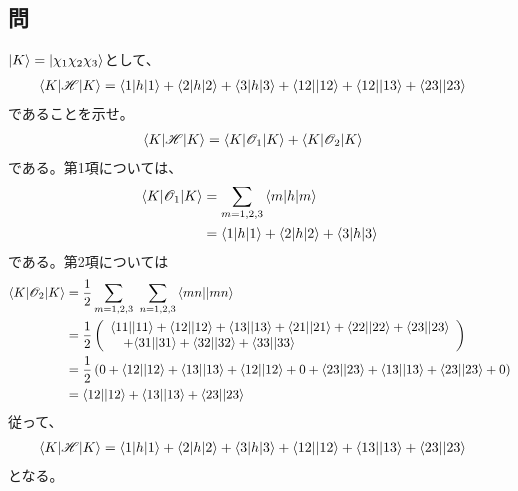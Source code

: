 \subsection{問}
$\ket{K}=\ket{\chi_1\chi_2\chi_3}$として、
\begin{align}
	\braket{K|\mathscr{H}|K}
&=
	\braket{1|h|1}
	+
	\braket{2|h|2}
	+
	\braket{3|h|3}
	+
	{\braket{12||12}}
	+
	{\braket{12||13}}
	+
	{\braket{23||23}}
\end{align}
であることを示せ。
\begin{align}
	\braket{K|\mathscr{H}|K}
&=
	\braket{K|\mathscr{O}_1|K}
	+
	\braket{K|\mathscr{O}_2|K}
\end{align}
である。第1項については、
\begin{align}
	\braket{K|\mathscr{O}_1|K}
&=
	\sum_{m=1,2,3} \braket{m|h|m} \\
%
%
&=
	\braket{1|h|1}
	+
	\braket{2|h|2}
	+
	\braket{3|h|3}
\end{align}
である。第2項については
\begin{align}
	\braket{K|\mathscr{O}_2|K}
&=
	\frac{1}{2}
	\sum_{m=1,2,3}\ \sum_{n=1,2,3}
		\antitwo{mn}{mn} \\
%
%
&=
	\frac{1}{2}
	\left(
	\begin{array}{l}
		\antitwo{11}{11}
		+
		\antitwo{12}{12}
		+
		\antitwo{13}{13}
		+
		\antitwo{21}{21}
		+
		\antitwo{22}{22}
		+
		\antitwo{23}{23} \\ \quad
		+
		\antitwo{31}{31}
		+
		\antitwo{32}{32}
		+
		\antitwo{33}{33}
	\end{array}
	\right) \\
%
%
&=
	\frac{1}{2}
	\left(
		0
		+
		\antitwo{12}{12}
		+
		\antitwo{13}{13}
		+
		\antitwo{12}{12}
		+
		0
		+
		\antitwo{23}{23}
		+
		\antitwo{13}{13}
		+
		\antitwo{23}{23}
		+
		0
	\right) \\
%
%
&=
	\antitwo{12}{12}
	+
	\antitwo{13}{13}
	+
	\antitwo{23}{23}
\end{align}
従って、
\begin{align}
	\braket{K|\mathscr{H}|K}
&=
	\braket{1|h|1}
	+
	\braket{2|h|2}
	+
	\braket{3|h|3}
	+
	{\braket{12||12}}
	+
	{\braket{13||13}}
	+
	{\braket{23||23}}
\end{align}
となる。



